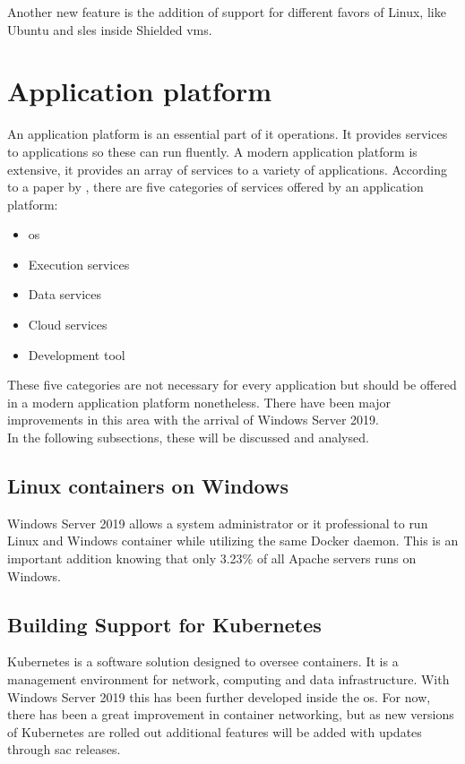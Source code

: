 Another new feature is the addition of support for different favors of Linux, like Ubuntu and \acrfull{sles} inside Shielded \acrshort{vm}s. 

\clearpage

\section{Application platform}
An application platform is an essential part of \acrshort{it} operations. 
It provides services to applications so these can run fluently. 
A modern application platform is extensive, it provides an array of services to a variety of applications. 
According to a paper by \textcite{Chappell2011}, there are five categories of services offered by an application platform:

\begin{itemize}
	\item \acrshort{os}
	\item Execution services
	\item Data services
	\item Cloud services
	\item Development tool
\end{itemize}

These five categories are not necessary for every application but should be offered in a modern application platform nonetheless.
There have been major improvements in this area with the arrival of Windows Server 2019. \autocite{Gerend2018} 
\\
In the following subsections, these will be discussed and analysed.

\subsection*{Linux containers on Windows}
Windows Server 2019 allows a system administrator or \acrshort{it} professional to run Linux and Windows container while utilizing the same Docker daemon. 
This is an important addition knowing that only 3.23\% of all Apache servers runs on Windows. \autocite{SecuritySpace2019}
\subsection*{Building Support for Kubernetes}
Kubernetes is a software solution designed to oversee containers. 
It is a management environment for network, computing and data infrastructure. 
With Windows Server 2019 this has been further developed inside the \acrshort{os}. 
For now, there has been a great improvement in container networking, but as new versions of Kubernetes are rolled out additional features will be added with updates through \acrfull{sac} releases.

